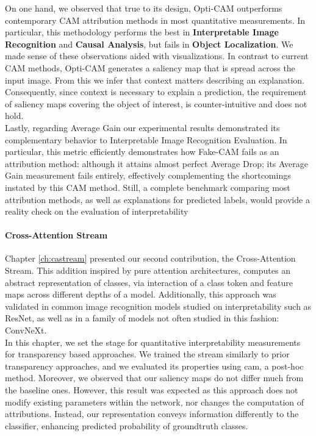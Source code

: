 \noindent On one hand, we observed that true to its design, Opti-CAM outperforms contemporary 
CAM attribution methods in most quantitative measurements. In particular, this methodology 
performs the best in \textbf{Interpretable Image Recognition} and \textbf{Causal Analysis}, but 
fails in \textbf{Object Localization}. We made sense of these observations aided with 
visualizations. In contrast to current CAM methods, Opti-CAM generates a saliency map that is 
spread across the input image. From this we infer that context matters describing an explanation. 
Consequently, since context is necessary to explain a prediction, the requirement of saliency maps 
covering the object of interest, is counter-intuitive and does not hold.\\

\noindent Lastly, regarding Average Gain our experimental results demonstrated its complementary 
behavior to Interpretable Image Recognition Evaluation.  In particular, this metric efficiently 
demonstrates how Fake-CAM fails as an attribution method: although it attains almost perfect 
Average Drop; its Average Gain measurement fails entirely, effectively complementing the 
shortcomings instated by this CAM method. Still, a complete benchmark comparing most attribution 
methods, as well as explanations for predicted labels, would provide a reality check on the 
evaluation of interpretability\\

\paragraph{Cross-Attention Stream}
\label{sub:conc_ca}
\noindent Chapter \ref{ch:castream} presented our second contribution, the Cross-Attention Stream. 
This addition inspired by pure attention architectures, computes an abstract representation of 
classes, via interaction of a class token and feature maps across different depths of a model. 
Additionally, this approach was validated in common image recognition models studied on 
interpretability such as ResNet, as well as in a family of models not often studied in this fashion: 
ConvNeXt.\\

\noindent In this chapter, we set the stage for quantitative interpretability measurements for 
transparency based approaches. We trained the stream similarly to prior transparency approaches, 
and we evaluated its properties using \gls{cam}, a post-hoc method. Moreover, we observed that our 
saliency maps do not differ much from the baseline ones. However, this result was expected as this 
approach does not modify existing parameters within the network, nor changes the computation of 
attributions. Instead, our representation conveys information differently to the classifier, 
enhancing predicted probability of groundtruth classes. \\

